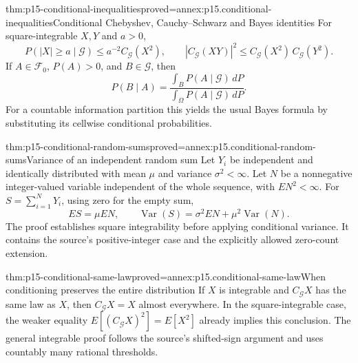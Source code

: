 \begin{hbtheorem}{thm:p15-conditional-inequalities}{proved=annex:p15.conditional-inequalities}{Conditional Chebyshev, Cauchy--Schwarz and Bayes identities}
For square-integrable \(X,Y\) and \(a>0\),
\[
 P(|X|\geq a\mid\mathcal G)\leq a^{-2}C_{\mathcal G}(X^2),\qquad
 |C_{\mathcal G}(XY)|^2
     \leq C_{\mathcal G}(X^2)\,C_{\mathcal G}(Y^2).
\]
If \(A\in\mathcal F_0\), \(P(A)>0\), and \(B\in\mathcal G\), then
\[
                 P(B\mid A)
                   =\frac{\int_B P(A\mid\mathcal G)\,dP}
                          {\int_\Omega P(A\mid\mathcal G)\,dP}.
\]
For a countable information partition this yields the usual Bayes
formula by substituting its cellwise conditional probabilities.
\end{hbtheorem}

\begin{hbtheorem}{thm:p15-conditional-random-sums}{proved=annex:p15.conditional-random-sums}{Variance of an independent random sum}
Let \(Y_i\) be independent and identically distributed with mean \(\mu\)
and variance \(\sigma^2<\infty\). Let \(N\) be a nonnegative
integer-valued variable independent of the whole sequence, with
\(EN^2<\infty\). For \(S=\sum_{i=1}^NY_i\), using zero for the empty sum,
\[
 ES=\mu EN,\qquad
 \operatorname{Var}(S)=\sigma^2EN+\mu^2\operatorname{Var}(N).
\]
The proof establishes square integrability before applying conditional
variance. It contains the source's positive-integer case and the
explicitly allowed zero-count extension.
\end{hbtheorem}

\begin{hbtheorem}{thm:p15-conditional-same-law}{proved=annex:p15.conditional-same-law}{When conditioning preserves the entire distribution}
If \(X\) is integrable and \(C_{\mathcal G}X\) has the same law as \(X\),
then \(C_{\mathcal G}X=X\) almost everywhere.
In the square-integrable case, the weaker equality
\(E[(C_{\mathcal G}X)^2]=E[X^2]\) already implies this conclusion.
The general integrable proof follows the source's shifted-sign argument
and uses countably many rational thresholds.
\end{hbtheorem}

